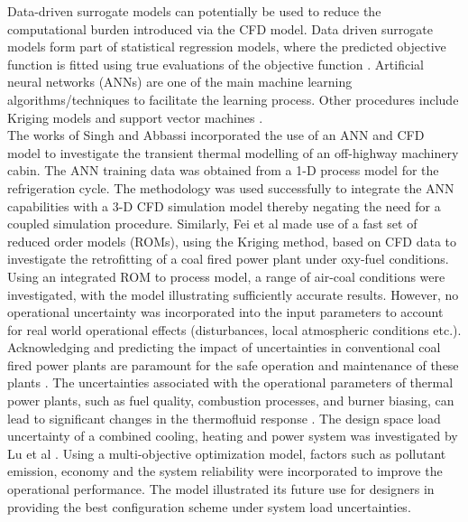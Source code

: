 \documentclass[a4paper,fleqn]{cas-dc}
\begin{document}
Data-driven surrogate models can potentially be used to reduce the computational burden introduced via the CFD model. Data driven surrogate models form part of statistical regression models, where the predicted objective function is fitted using true evaluations of the objective function \cite{Wheeler2019}. Artificial neural networks (ANNs) are one of the main machine learning algorithms/techniques to facilitate the learning process. Other procedures include Kriging models \cite{Fei2015} and support vector machines \cite{Lv2017}.\\

The works of Singh and Abbassi \cite{Singh2018} incorporated the use of an ANN and CFD model to investigate the transient thermal modelling of an off-highway machinery cabin. The ANN training data was obtained from a 1-D process model for the refrigeration cycle. The methodology was used successfully to integrate the ANN capabilities with a 3-D CFD simulation model thereby negating the need for a coupled simulation procedure. Similarly, Fei et al \cite{Fei2015} made use of a fast set of reduced order models (ROMs), using the Kriging method, based on CFD data to investigate the retrofitting of a coal fired power plant under oxy-fuel conditions. Using an integrated ROM to process model, a range of air-coal conditions were investigated, with the model illustrating sufficiently accurate results. However, no operational uncertainty was incorporated into the input parameters to account for real world operational effects (disturbances, local atmospheric conditions etc.).\\

Acknowledging and predicting the impact of uncertainties in conventional coal fired power plants are paramount for the safe operation and maintenance of these plants \cite{Madejski_18}. The uncertainties associated with the operational parameters of thermal power plants, such as fuel quality, combustion processes, and  burner biasing, can lead to significant changes in the thermofluid response \cite{Sarkar2015}. The design space load uncertainty of a combined cooling, heating and power system was investigated by Lu et al \cite{Lu2021}. Using a multi-objective optimization model, factors such as pollutant emission, economy and the system reliability were incorporated to improve the operational performance. The model illustrated its future use for designers in providing the best configuration scheme under system load uncertainties.\\ 
\end{document}
